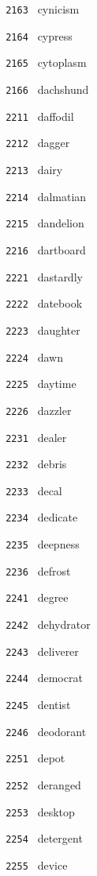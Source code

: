 \documentclass[11pt]{article}
\begin{document}
\begin{multicols}{6}
\noindent \texttt{ 2163 } cynicism  \par
\noindent \texttt{ 2164 } cypress  \par
\noindent \texttt{ 2165 } cytoplasm  \par
\noindent \texttt{ 2166 } dachshund  \par
\noindent \texttt{ 2211 } daffodil  \par
\noindent \texttt{ 2212 } dagger  \par
\noindent \texttt{ 2213 } dairy  \par
\noindent \texttt{ 2214 } dalmatian  \par
\noindent \texttt{ 2215 } dandelion  \par
\noindent \texttt{ 2216 } dartboard  \par
\noindent \texttt{ 2221 } dastardly  \par
\noindent \texttt{ 2222 } datebook  \par
\noindent \texttt{ 2223 } daughter  \par
\noindent \texttt{ 2224 } dawn  \par
\noindent \texttt{ 2225 } daytime  \par
\noindent \texttt{ 2226 } dazzler  \par
\noindent \texttt{ 2231 } dealer  \par
\noindent \texttt{ 2232 } debris  \par
\noindent \texttt{ 2233 } decal  \par
\noindent \texttt{ 2234 } dedicate  \par
\noindent \texttt{ 2235 } deepness  \par
\noindent \texttt{ 2236 } defrost  \par
\noindent \texttt{ 2241 } degree  \par
\noindent \texttt{ 2242 } dehydrator  \par
\noindent \texttt{ 2243 } deliverer  \par
\noindent \texttt{ 2244 } democrat  \par
\noindent \texttt{ 2245 } dentist  \par
\noindent \texttt{ 2246 } deodorant  \par
\noindent \texttt{ 2251 } depot  \par
\noindent \texttt{ 2252 } deranged  \par
\noindent \texttt{ 2253 } desktop  \par
\noindent \texttt{ 2254 } detergent  \par
\noindent \texttt{ 2255 } device  \par

\end{multicols}
\end{document}
